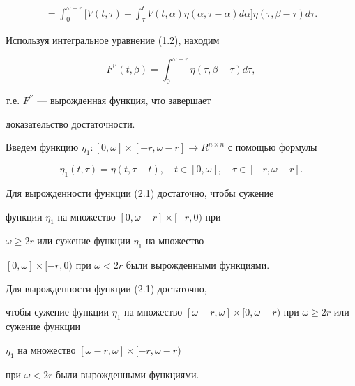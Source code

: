 \begin{pf}
\begin{gather*}
%


= \int_{0}^{\omega-r}\bigg[V(t, \tau) + \int_{\tau}^{t}V(t, \alpha)


 \eta(\alpha, \tau- \alpha) d \alpha\bigg] \eta(\tau, \beta- \tau) d \tau.


\end{gather*}


Используя интегральное уравнение (1.2), находим


$$


F^{ \prime \prime}(t, \beta) = \int_{0}^{\omega-r} \eta(


 \tau, \beta- \tau) d \tau,


$$


т.е. $F^{\prime \prime}$ --- вырожденная функция, что завершает


доказательство достаточности.


\end{pf}





Введем функцию $ \eta_{1} : [0, \omega] \times[-r, \omega-r]


\rightarrow R^{n \times n}$ с помощью формулы


$$


\eta_{1}(t, \tau) = \eta(t, \tau-t),


\quad t \in[0, \omega], \quad \tau \in[-r, \omega-r].


$$





\begin{note}


Для вырожденности функции (2.1) достаточно, чтобы сужение


функции $ \eta_{1}$ на множество $[0, \omega-r] \times[-r,0)$ при


$ \omega \geq 2r$ или сужение функции $ \eta_{1}$ на множество


$[0, \omega] \times[-r,0)$ при $ \omega < 2r$ были вырожденными функциями.


\end{note}





\begin{note}


Для вырожденности функции (2.1) достаточно,


чтобы сужение функции $ \eta_{1}$ на множество $[\omega-r, \omega]


\times[0, \omega-r)$ при $ \omega \geq 2r$ или сужение функции


$\eta_{1}$ на множество $[\omega-r, \omega] \times[-r, \omega-r)$


при $ \omega < 2r$ были вырожденными функциями.


\end{note}






